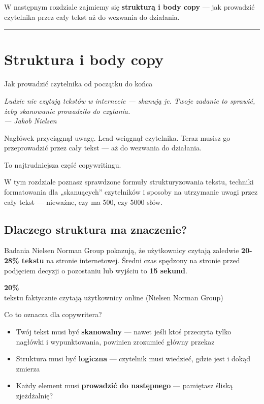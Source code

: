 \documentclass[
  12pt,
  a4paper,
  twoside,
  openright,
  12pt,
  DIV=12,
  BCOR=12mm]{scrbook}
\providecommand{\tightlist}{%
  \setlength{\itemsep}{0pt}\setlength{\parskip}{0pt}}\usepackage{longtable,booktabs,array}
\newcommand{\chapteropener}[1]{%
  \begin{center}
    \large\itshape\color{textmuted}#1
  \end{center}
  \vspace{1em}
}
\newcommand{\decoline}{%
  \begin{center}
    \textcolor{bordergray}{\rule{0.3\textwidth}{0.5pt}}
  \end{center}
}
\newcommand{\stathighlight}[2]{%
  \begin{center}
    \begin{tcolorbox}[
      enhanced,
      colback=primarylight,
      colframe=primaryblue,
      boxrule=1pt,
      arc=5pt,
      width=0.6\textwidth,
      halign=center
    ]
      {\fontsize{36}{40}\selectfont\bfseries\color{primarydark}#1}\\[5pt]
      {\color{textmuted}#2}
    \end{tcolorbox}
  \end{center}
}
\begin{document}
W następnym rozdziale zajmiemy się \textbf{strukturą i body copy} ---
jak prowadzić czytelnika przez cały tekst aż do wezwania do działania.

\decoline


\chapter{Struktura i body copy}\label{struktura-i-body-copy}

Jak prowadzić czytelnika od początku do końca

\hfill\break

\chapteropener{Ludzie nie czytają tekstów w internecie --- skanują je. Twoje zadanie to sprawić, żeby skanowanie prowadziło do czytania.\\--- Jakob Nielsen}

Nagłówek przyciągnął uwagę. Lead wciągnął czytelnika. Teraz musisz go
przeprowadzić przez cały tekst --- aż do wezwania do działania.

To najtrudniejsza część copywritingu.

W tym rozdziale poznasz sprawdzone formuły strukturyzowania tekstu,
techniki formatowania dla „skanuących'' czytelników i sposoby na
utrzymanie uwagi przez cały tekst --- nieważne, czy ma 500, czy 5000
słów.

\section{Dlaczego struktura ma
znaczenie?}\label{dlaczego-struktura-ma-znaczenie}

Badania Nielsen Norman Group pokazują, że użytkownicy czytają zaledwie
\textbf{20-28\% tekstu} na stronie internetowej. Średni czas spędzony na
stronie przed podjęciem decyzji o pozostaniu lub wyjściu to \textbf{15
sekund}.

\stathighlight{20\%}{tekstu faktycznie czytają użytkownicy online (Nielsen Norman Group)}

Co to oznacza dla copywritera?

\begin{itemize}
\tightlist
\item
  Twój tekst musi być \textbf{skanowalny} --- nawet jeśli ktoś przeczyta
  tylko nagłówki i wypunktowania, powinien zrozumieć główny przekaz
\item
  Struktura musi być \textbf{logiczna} --- czytelnik musi wiedzieć,
  gdzie jest i dokąd zmierza
\item
  Każdy element musi \textbf{prowadzić do następnego} --- pamiętasz
  śliską zjeżdżalnię?
\end{itemize}
\end{document}
